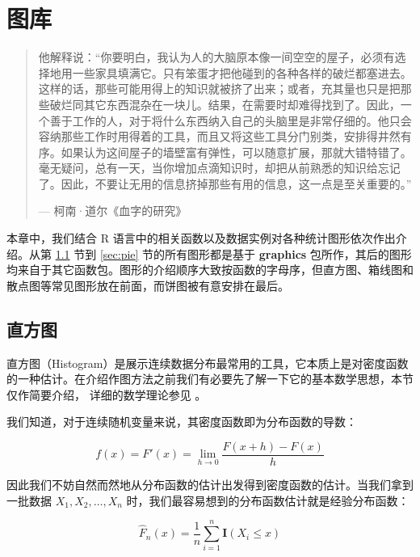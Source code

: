 \documentclass[
  b5paper,
  UTF8,twoside]{book}
\begin{document}
\hypertarget{cha:gallery}{%
\chapter{图库}\label{cha:gallery}}

\begin{quote}
他解释说：``你要明白，我认为人的大脑原本像一间空空的屋子，必须有选择地用一些家具填满它。只有笨蛋才把他碰到的各种各样的破烂都塞进去。这样的话，那些可能用得上的知识就被挤了出来；或者，充其量也只是把那些破烂同其它东西混杂在一块儿。结果，在需要时却难得找到了。因此，一个善于工作的人，对于将什么东西纳入自己的头脑里是非常仔细的。他只会容纳那些工作时用得着的工具，而且又将这些工具分门别类，安排得井然有序。如果认为这间屋子的墙壁富有弹性，可以随意扩展，那就大错特错了。毫无疑问，总有一天，当你增加点滴知识时，却把从前熟悉的知识给忘记了。因此，不要让无用的信息挤掉那些有用的信息，这一点是至关重要的。''

\hspace*{\fill} --- 柯南·道尔《血字的研究》
\end{quote}

本章中，我们结合 R 语言中的相关函数以及数据实例对各种统计图形依次作出介绍。从第 \ref{sec:hist} 节到 \ref{sec:pie} 节的所有图形都是基于 \textbf{graphics} 包所作，其后的图形均来自于其它函数包。图形的介绍顺序大致按函数的字母序，但直方图、箱线图和散点图等常见图形放在前面，而饼图被有意安排在最后。

\hypertarget{sec:hist}{%
\section{直方图}\label{sec:hist}}

直方图（Histogram）是展示连续数据分布最常用的工具，它本质上是对密度函数的一种估计。在介绍作图方法之前我们有必要先了解一下它的基本数学思想，本节仅作简要介绍，
详细的数学理论参见 \citet{Scott92}。

我们知道，对于连续随机变量来说，其密度函数即为分布函数的导数：

\begin{equation} 
f(x)=F'(x)=\lim_{h\rightarrow0}\frac{F(x+h)-F(x)}{h}
\label{eq:density}
\end{equation}

因此我们不妨自然而然地从分布函数的估计出发得到密度函数的估计。当我们拿到一批数据 \(X_1,X_2,\ldots,X_n\) 时，我们最容易想到的分布函数估计就是经验分布函数：

\begin{equation} 
\hat{F}_{n}(x)=\frac{1}{n}\sum_{i=1}^{n}\mathbf{I}(X_{i}\leq x)
\label{eq:empirical}
\end{equation}
\end{document}
